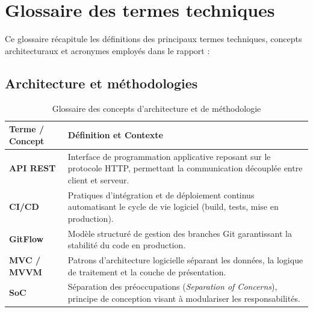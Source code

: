 \chapter{Glossaire des termes techniques}
\label{annexe:glossaire}
\finPageTitre

\noindent
Ce glossaire r\'ecapitule les d\'efinitions des principaux termes techniques, concepts architecturaux et acronymes employ\'es dans le rapport :

\section*{Architecture et m\'ethodologies}
\begin{table}[H]
\centering
\begin{tabularx}{\textwidth}{p{4.2cm} X}
\toprule
\textbf{Terme / Concept} & \textbf{D\'efinition et Contexte} \\
\midrule
\textbf{API REST} & Interface de programmation applicative reposant sur le protocole HTTP, permettant la communication d\'ecoupl\'ee entre client et serveur. \\
\textbf{CI/CD}    & Pratiques d'int\'egration et de d\'eploiement continus automatisant le cycle de vie logiciel (build, tests, mise en production). \\
\textbf{GitFlow}  & Mod\`ele structur\'e de gestion des branches Git garantissant la stabilit\'e du code en production. \\
\textbf{MVC / MVVM}& Patrons d'architecture logicielle s\'eparant les donn\'ees, la logique de traitement et la couche de pr\'esentation. \\
\textbf{SoC}      & S\'eparation des pr\'eoccupations (\textit{Separation of Concerns}), principe de conception visant \`a modulariser les responsabilit\'es. \\
\bottomrule
\end{tabularx}
\caption{Glossaire des concepts d'architecture et de m\'ethodologie}
\label{tab:glossaire-archi}
\end{table}

